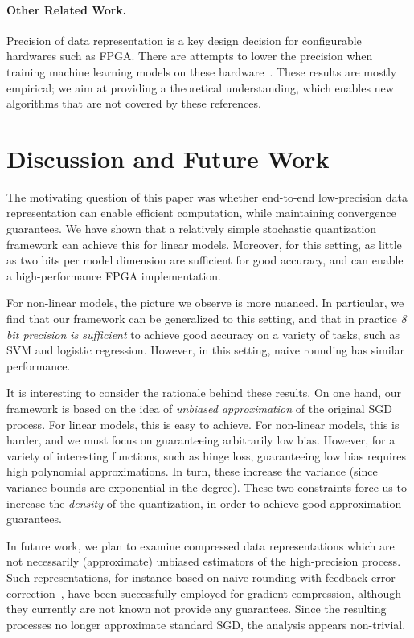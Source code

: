 \documentclass{article}
\begin{document}
\vspace{-1em}
\paragraph{Other Related Work.} Precision of data
representation is a key design decision
for configurable hardwares such as FPGA. There are attempts to
lower the precision when training machine learning models
on these hardware~\cite{Kim:2011:ICASSP}. 
These results are mostly empirical; we
aim at providing a theoretical understanding, which 
enables new algorithms that are not covered 
by these references.

\vspace{-1em}
\section{Discussion and Future Work}
\label{sec:conclusions}

The motivating question of this paper was whether end-to-end low-precision data representation can enable efficient computation, while maintaining convergence guarantees. 
We have shown that a relatively simple stochastic quantization framework can achieve this for linear models. 
Moreover, for this setting, as little as two bits per model dimension are sufficient for good accuracy, and can enable a high-performance FPGA implementation.  

For non-linear models, the picture we observe is more nuanced. 
In particular, we find that our framework can be generalized to this setting, and that in practice \emph{8 bit precision is sufficient} to achieve good accuracy on a variety of tasks, such as SVM and logistic regression. 
However, in this setting, naive rounding has similar performance. 

It is interesting to consider the rationale behind these results. On one hand, our framework is based on the idea of \emph{unbiased approximation} of the original SGD process. For linear models, this is easy to achieve. For non-linear models, this is harder, and we must focus on guaranteeing arbitrarily low bias. 
However, for a variety of interesting functions, such as hinge loss, guaranteeing low bias requires high polynomial approximations. In turn, these increase the variance (since variance bounds are exponential in the degree). These two constraints force us to increase the \emph{density} of the quantization, in order to achieve good approximation guarantees. 

In future work, we plan to examine compressed data representations which are not necessarily (approximate) unbiased estimators of the high-precision process. 
Such representations, for instance based on naive rounding with feedback error correction~\cite{1BitSGD}, have been successfully employed for gradient compression, although they currently are not known not provide any guarantees. Since the resulting processes no longer approximate standard SGD, the analysis appears non-trivial. 
\end{document}

